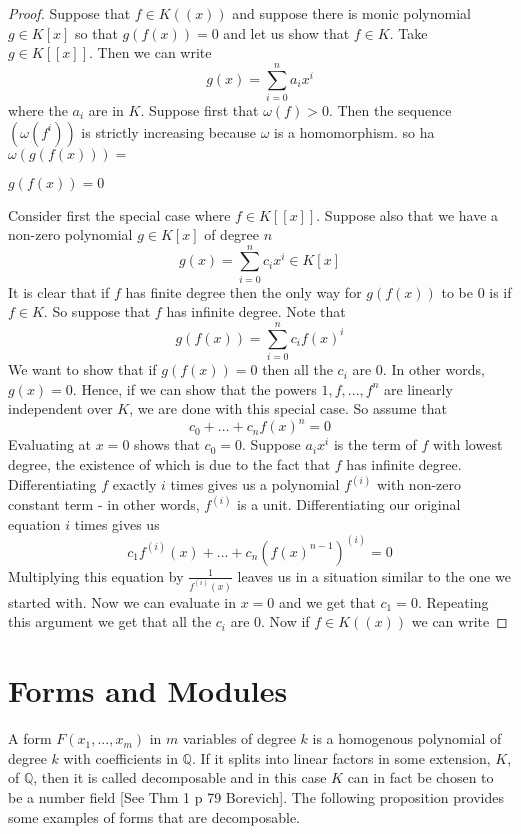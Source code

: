 \documentclass{article}
\newcommand{\mbb}[1]{\mathbb{#1}}
\begin{document}
\begin{proof}
    Suppose that $f \in K((x))$ and suppose there is monic polynomial $g \in K[x]$ so that $g(f(x)) = 0$ and let us show that $f \in K$. Take $g \in K[[x]]$. Then we can write
    $$g(x) = \sum_{i=0}^n a_i x^i$$
    where the $a_i$ are in $K$. 
    Suppose first that $\omega(f) > 0$. Then the sequence $(\omega(f^i))$ is strictly increasing because $\omega$ is a homomorphism. so ha $\omega(g(f(x))) =  $ 
    
    $g(f(x)) = 0$

    Consider first the special case where $f \in K[[x]]$. Suppose also that we have a non-zero polynomial $g \in K[x]$ of degree $n$
    $$g(x) = \sum_{i = 0}^n c_i x^i \in K[x]$$
    It is clear that if $f$ has finite degree then the only way for $g(f(x))$ to be 0 is if $f \in K$. So suppose that $f$ has infinite degree. Note that
    $$g(f(x)) = \sum_{i = 0}^n c_i f(x)^i$$
    We want to show that if $g(f(x)) = 0$ then all the $c_i$ are 0. In other words, $g(x) = 0$. Hence, if we can show that the powers $1, f, ..., f^{n}$ are linearly independent over $K$, we are done with this special case. So assume that 
    $$c_0  + ... + c_n f(x)^n = 0$$
    Evaluating at $x = 0$ shows that $c_0 = 0$. Suppose $a_i x^i$ is the term of $f$ with lowest degree, the existence of which is due to the fact that $f$ has infinite degree. Differentiating $f$ exactly $i$ times gives us a polynomial $f^{(i)}$ with non-zero constant term - in other words, $f^{(i)}$ is a unit. Differentiating our original equation $i$ times gives us 
    $$c_1 f^{(i)}(x) + ... + c_n (f(x)^{n-1})^{(i)} = 0$$
    Multiplying this equation by $\frac{1}{f^{(i)}(x)}$ leaves us in a situation similar to the one we started with. Now we can evaluate in $x = 0$ and we get that $c_1 = 0$. Repeating this argument we get that all the $c_i$ are 0. Now if $f \in K((x))$ we can write 
\end{proof}








\section{Forms and Modules}
A form $F(x_1, ..., x_m)$ in $m$ variables of degree $k$ is a homogenous polynomial of degree $k$ with coefficients in $\mbb{Q}$. If it splits into linear factors in some extension, $K$, of $\mbb{Q}$, then it is called decomposable and in this case $K$ can in fact be chosen to be a number field [See Thm 1 p 79 Borevich]. The following proposition provides some examples of forms that are decomposable.
\end{document}
